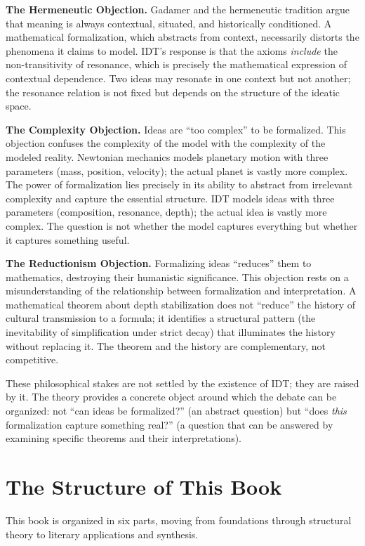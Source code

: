 \documentclass[11pt,openany]{book}
\theoremstyle{definition}
\theoremstyle{plain}
\theoremstyle{remark}
\begin{document}
\textbf{The Hermeneutic Objection.} Gadamer and the hermeneutic tradition argue that meaning is always contextual, situated, and historically conditioned. A mathematical formalization, which abstracts from context, necessarily distorts the phenomena it claims to model. IDT's response is that the axioms \emph{include} the non-transitivity of resonance, which is precisely the mathematical expression of contextual dependence. Two ideas may resonate in one context but not another; the resonance relation is not fixed but depends on the structure of the ideatic space.

\textbf{The Complexity Objection.} Ideas are ``too complex'' to be formalized. This objection confuses the complexity of the model with the complexity of the modeled reality. Newtonian mechanics models planetary motion with three parameters (mass, position, velocity); the actual planet is vastly more complex. The power of formalization lies precisely in its ability to abstract from irrelevant complexity and capture the essential structure. IDT models ideas with three parameters (composition, resonance, depth); the actual idea is vastly more complex. The question is not whether the model captures everything but whether it captures something useful.

\textbf{The Reductionism Objection.} Formalizing ideas ``reduces'' them to mathematics, destroying their humanistic significance. This objection rests on a misunderstanding of the relationship between formalization and interpretation. A mathematical theorem about depth stabilization does not ``reduce'' the history of cultural transmission to a formula; it identifies a structural pattern (the inevitability of simplification under strict decay) that illuminates the history without replacing it. The theorem and the history are complementary, not competitive.

These philosophical stakes are not settled by the existence of IDT; they are raised by it. The theory provides a concrete object around which the debate can be organized: not ``can ideas be formalized?'' (an abstract question) but ``does \emph{this} formalization capture something real?'' (a question that can be answered by examining specific theorems and their interpretations).

\section{The Structure of This Book}

This book is organized in six parts, moving from foundations through structural theory to literary applications and synthesis.
\end{document}
